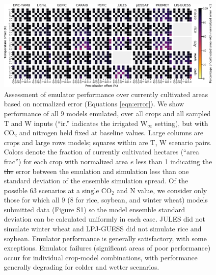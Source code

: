 \documentclass[gmdd]{copernicus} %
\providecommand{\DIFdel}[1]{{\protect\color{red}\sout{#1}}}                      %
\providecommand{\DIFaddend}{} %
\providecommand{\DIFdelFL}[1]{\DIFdel{#1}} %
\providecommand{\DIFdelbeginFL}{} %
\providecommand{\DIFdelendFL}{} %
\begin{document}
\DIFaddend \begin{figure}[ht]
    \centering
        \includegraphics[width=16.3cm]{figures/error_grid_new.png}
        \caption{
        Assessment of emulator performance over currently cultivated areas based on normalized error (Equations \ref{eqn:error}). 
        We show performance of all 9 models emulated, over all crops and all sampled T and W inputs (``ir.'' indicates the irrigated W$_{\infty}$ setting), but with CO$_2$ and nitrogen held fixed at baseline values. 
        Large columns are crops and large rows models; squares within are T, W scenario pairs. 
        Colors denote the fraction of currently cultivated hectares (``area frac'') for each crop with normalized area $e$ less than 1 indicating the \DIFdelbeginFL \DIFdelFL{the }\DIFdelendFL error between the emulation and simulation less than one standard deviation of the ensemble simulation spread. 
        Of the possible 63 scenarios at a single CO$_2$ and N value, we consider only those for which all 9 (8 for rice, soybean, and winter wheat) models submitted data (Figure S1) so the model ensemble standard deviation can be calculated uniformly in each case. 
        JULES did not simulate winter wheat and LPJ-GUESS did not simulate rice and soybean. Emulator performance is generally satisfactory, with some exceptions. 
        Emulator failures (significant areas of poor performance) occur for individual crop-model combinations, with performance generally degrading for colder and wetter scenarios.
        }
       \label{fig:error_360}
    \end{figure}
\end{document}
